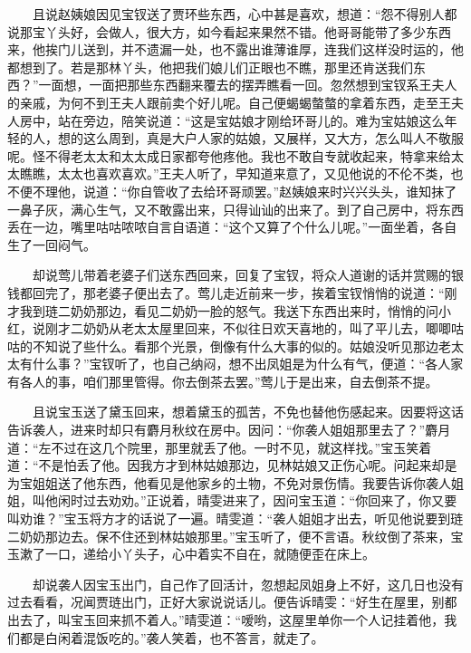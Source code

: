 　　且说赵姨娘因见宝钗送了贾环些东西，心中甚是喜欢，想道：“怨不得别人都说那宝丫头好，会做人，很大方，如今看起来果然不错。他哥哥能带了多少东西来，他挨门儿送到，并不遗漏一处，也不露出谁薄谁厚，连我们这样没时运的，他都想到了。若是那林丫头，他把我们娘儿们正眼也不瞧，那里还肯送我们东西？”一面想，一面把那些东西翻来覆去的摆弄瞧看一回。忽然想到宝钗系王夫人的亲戚，为何不到王夫人跟前卖个好儿呢。自己便蝎蝎螫螫的拿着东西，走至王夫人房中，站在旁边，陪笑说道：“这是宝姑娘才刚给环哥儿的。难为宝姑娘这么年轻的人，想的这么周到，真是大户人家的姑娘，又展样，又大方，怎么叫人不敬服呢。怪不得老太太和太太成日家都夸他疼他。我也不敢自专就收起来，特拿来给太太瞧瞧，太太也喜欢喜欢。”王夫人听了，早知道来意了，又见他说的不伦不类，也不便不理他，说道：“你自管收了去给环哥顽罢。”赵姨娘来时兴兴头头，谁知抹了一鼻子灰，满心生气，又不敢露出来，只得讪讪的出来了。到了自己房中，将东西丢在一边，嘴里咕咕哝哝自言自语道：“这个又算了个什么儿呢。”一面坐着，各自生了一回闷气。

　　却说莺儿带着老婆子们送东西回来，回复了宝钗，将众人道谢的话并赏赐的银钱都回完了，那老婆子便出去了。莺儿走近前来一步，挨着宝钗悄悄的说道：“刚才我到琏二奶奶那边，看见二奶奶一脸的怒气。我送下东西出来时，悄悄的问小红，说刚才二奶奶从老太太屋里回来，不似往日欢天喜地的，叫了平儿去，唧唧咕咕的不知说了些什么。看那个光景，倒像有什么大事的似的。姑娘没听见那边老太太有什么事？”宝钗听了，也自己纳闷，想不出凤姐是为什么有气，便道：“各人家有各人的事，咱们那里管得。你去倒茶去罢。”莺儿于是出来，自去倒茶不提。

　　且说宝玉送了黛玉回来，想着黛玉的孤苦，不免也替他伤感起来。因要将这话告诉袭人，进来时却只有麝月秋纹在房中。因问：“你袭人姐姐那里去了？”麝月道：“左不过在这几个院里，那里就丢了他。一时不见，就这样找。”宝玉笑着道：“不是怕丢了他。因我方才到林姑娘那边，见林姑娘又正伤心呢。问起来却是为宝姐姐送了他东西，他看见是他家乡的土物，不免对景伤情。我要告诉你袭人姐姐，叫他闲时过去劝劝。”正说着，晴雯进来了，因问宝玉道：“你回来了，你又要叫劝谁？”宝玉将方才的话说了一遍。晴雯道：“袭人姐姐才出去，听见他说要到琏二奶奶那边去。保不住还到林姑娘那里。”宝玉听了，便不言语。秋纹倒了茶来，宝玉漱了一口，递给小丫头子，心中着实不自在，就随便歪在床上。

　　却说袭人因宝玉出门，自己作了回活计，忽想起凤姐身上不好，这几日也没有过去看看，况闻贾琏出门，正好大家说说话儿。便告诉晴雯：“好生在屋里，别都出去了，叫宝玉回来抓不着人。”晴雯道：“嗳哟，这屋里单你一个人记挂着他，我们都是白闲着混饭吃的。”袭人笑着，也不答言，就走了。

